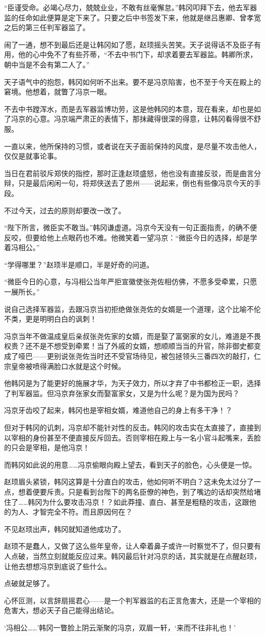 “臣谨受命。必竭心尽力，兢兢业业，不敢有丝毫懈怠。”韩冈叩拜下去，他去军器监的任命如此便算是定下来了。只要之后中书签发下来，他就是继吕惠卿、曾孝宽之后的第三任判军器监了。

闹了一通，想不到最后还是让韩冈如了愿，赵顼摇头苦笑。天子说得话不及臣子有用，他的心中免不了有些芥蒂，“不去中书门下，却求着要去军器监。韩卿所求，朝中当是不会有第二人了。”

天子语气中的抱怨，韩冈如何听不出来。要不是冯京陷害，也不至于今天在殿上的窘境。他想着，就瞥了冯京一眼。

不去中书蹚浑水，而是去军器监博功劳，这是他韩冈的本意，现在看来，却也是如了冯京的心意。冯京端严肃正的表情下，那抹藏得很深的得意，让韩冈看得很不舒服。

一直以来，他所保持的习惯，或者说在天子面前保持的风度，是尽量不攻击他人，仅仅是就事论事。

当日在君前驳斥郑侠的指控，那时正逢赵顼盛怒，他也没有直接反驳，而是曲言分辩，只是最后闲闲一句，将郑侠送去了恩州——说起来，倒也有些像冯京今天的手段。

不过今天，过去的原则却要改一改了。

“陛下所言，微臣实不敢当。”韩冈谦虚道。冯京今天没有一句正面指责，的确不便反咬，但要给他上点眼药也不难。他微笑着一望冯京：“微臣今日的选择，却是学着冯相公。”

“学得哪里？”赵顼半是顺口，半是好奇的问道。

“微臣今日的心意，与冯相公当年严拒宣徽使张尧佐相仿佛，不愿多受牵累，只愿一展所长。”

说自己选择军器监，去跟冯京当初拒绝做张尧佐的女婿是一个道理，这个比喻不伦不类，更是明明白白的讽刺！

冯京当年不做温成皇后亲叔张尧佐家的女婿，而是娶了富弼家的女儿，难道是不畏权贵？还不是不想受到牵累！当了外戚的女婿，想顺顺当当的升官，除非御史都变成了哑巴——更别说张尧佐当时还不受官场待见，被包拯领头三番四次的敲打，仁宗皇帝被喷得满脸口水就是这个时候。

他韩冈是为了能更好的施展才华，为天子效力，所以才弃了中书都检正一职，选择了判军器监。但冯京弃张家女而娶富家女，又是为什么呢？是为国为民吗？

冯京牙齿咬了起来，韩冈也是宰相女婿，难道他自己的身上有多干净！？

但对于韩冈的讥刺，冯京却不能针对性的反击。韩冈的攻击实在太直接了，直接到以宰相的身份甚至不便直接反斥回去。否则宰相在殿上与一名小官斗起嘴来，丢脸的只会是宰相，是他冯京！

而韩冈如此说的用意……冯京偷眼向殿上望去，看到天子的脸色，心头便是一惊。

赵顼眉头紧锁，韩冈这算是十分直白的攻击，他如何听不明白？这未免太过分了一点，想着便要斥责。只是看到台陛下的两名臣僚的神色，到了嘴边的话却突然给堵住了……韩冈为什么要攻击冯京！？如此莽撞、直白、甚至是粗糙的攻击，这跟他的为人、才智完全不符。而且原因何在？

不见赵顼出声，韩冈就知道他成功了。

赵顼不是蠢人，又做了这么些年皇帝，让人牵着鼻子或许一时察觉不了，但只要有人点破，当然立刻就能反应过来。韩冈最后针对冯京的话，其实就是在点醒赵顼，让他去想想冯京到底说了些什么。

点破就足够了。

心怀叵测，以言辞扇摇君心——是一个判军器监的右正言危害大，还是一个宰相的危害大，想必天子自己能得出结论。

‘冯相公……’韩冈一瞥脸上阴云渐聚的冯京，双眉一轩，‘来而不往非礼也！’


